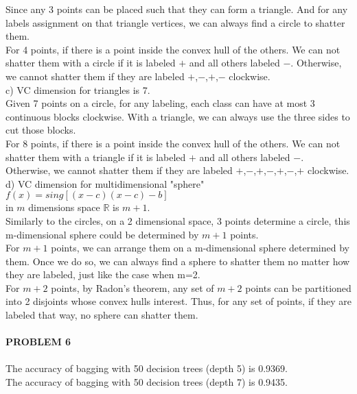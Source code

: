 \documentclass[11pt,a4paper,fleqn]{article}
\begin{document}
Since any 3 points can be placed such that they can form a triangle. And for any labels assignment on that triangle vertices, we can always find a circle to shatter them.\\
For 4 points, if there is a point inside the convex hull of the others. We can not shatter them with a circle if it is labeled $+$ and all others labeled $-$. Otherwise, we cannot shatter them if they are labeled $+$,$-$,$+$,$-$ clockwise.\\
c) VC dimension for triangles is 7.\\
Given 7 points on a circle, for any labeling, each class can have at most 3 continuous blocks clockwise. With a triangle, we can always use the three sides to cut those blocks.\\ 
For 8 points, if there is a point inside the convex hull of the others. We can not shatter them with a triangle if it is labeled $+$ and all others labeled $-$. Otherwise, we cannot shatter them if they are labeled $+$,$-$,$+$,$-$,$+$,$-$,$+$ clockwise.\\
d) VC dimension for multidimensional "sphere" $f(x)=sing[(x-c)(x-c)-b]$ \\in $m$ dimensions space $\mathbb{R}$ is $m+1$.\\
Similarly to the circles, on a 2 dimensional space, 3 points determine a circle, this m-dimensional sphere could be determined by $m+1$ points.\\
For $m+1$ points, we can arrange them on a m-dimensional sphere determined by them. Once we do so, we can always find a sphere to shatter them no matter how they are labeled, just like the case when m=2.\\
For $m+2$ points, by Radon's theorem, any set of $m+2$ points can be partitioned into 2 disjoints whose convex hulls interest. Thus, for any set of points, if they are labeled that way, no sphere can shatter them.\\
\\
\textbf{PROBLEM 6}\\
\\
The accuracy of bagging with 50 decision trees (depth 5) is 0.9369.\\
The accuracy of bagging with 50 decision trees (depth 7) is 0.9435.\\
\end{document}
